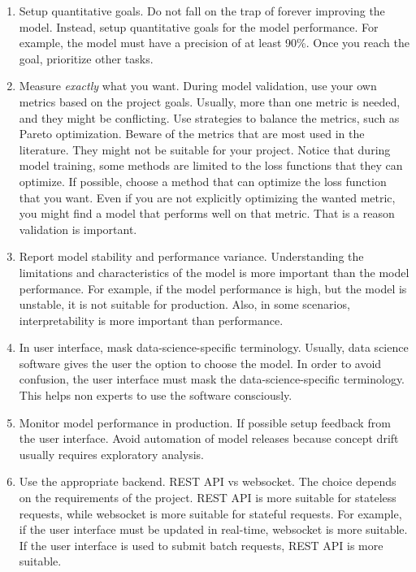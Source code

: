 \begin{enumerate}
  \item Setup quantitative goals.  Do not fall on the trap of forever improving the model.
    Instead, setup quantitative goals for the model performance.  For example, the model
    must have a precision of at least 90\%.  Once you reach the goal, prioritize other
    tasks.
  \item Measure \emph{exactly} what you want.  During model validation, use your own
    metrics based on the project goals.  Usually, more than one metric is needed, and they
    might be conflicting.  Use strategies to balance the metrics, such as Pareto
    optimization.  Beware of the metrics that are most used in the literature.  They might not
    be suitable for your project.  Notice that during model training, some methods are
    limited to the loss functions that they can optimize.  If possible, choose a method
    that can optimize the loss function that you want.  Even if you are not explicitly
    optimizing the wanted metric, you might find a model that performs well on that metric.
    That is a reason validation is important.
  \item Report model stability and performance variance.  Understanding the limitations
    and characteristics of the model is more important than the model performance.  For
    example, if the model performance is high, but the model is unstable, it is not
    suitable for production.  Also, in some scenarios, interpretability is more important than
    performance.
  \item In user interface, mask data-science-specific terminology.  Usually, data science
    software gives the user the option to choose the model.  In order to avoid confusion,
    the user interface must mask the data-science-specific terminology.  This helps non
    experts to use the software consciously.
  \item Monitor model performance in production.  If possible setup feedback from the user
    interface.  Avoid automation of model releases because concept drift usually requires
    exploratory analysis.
  \item Use the appropriate backend.  REST API vs websocket.  The choice depends on the
    requirements of the project.  REST API is more suitable for stateless requests, while
    websocket is more suitable for stateful requests.  For example, if the user interface
    must be updated in real-time, websocket is more suitable.  If the user interface is
    used to submit batch requests, REST API is more suitable.
\end{enumerate}
